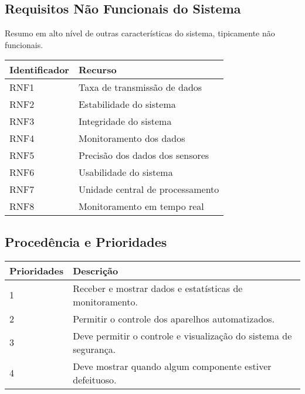 \subsection{Requisitos Não Funcionais do Sistema}

	Resumo em alto nível de outras características do sistema, tipicamente não funcionais.

\begin{tabular}{|l|l|}
\hline 
\textbf{Identificador} & \textbf{Recurso}\tabularnewline
\hline 
\hline 
RNF1 & Taxa de transmissão de dados\tabularnewline
\hline 
RNF2 & Estabilidade do sistema\tabularnewline
\hline 
RNF3 & Integridade do sistema\tabularnewline
\hline 
RNF4 & Monitoramento dos dados\tabularnewline
\hline 
RNF5 & Precisão dos dados dos sensores\tabularnewline
\hline 
RNF6 & Usabilidade do sistema\tabularnewline
\hline 
RNF7 & Unidade central de processamento\tabularnewline
\hline 
RNF8 & Monitoramento em tempo real\tabularnewline
\hline 
\end{tabular}

\subsection{Procedência e Prioridades}

\begin{tabular}{|l|l|}
\hline 
\textbf{Prioridades} & \textbf{Descrição}\tabularnewline
\hline 
\hline 
1 & Receber e mostrar dados e estatísticas de monitoramento. \tabularnewline
\hline 
2 & Permitir o controle dos aparelhos automatizados. \tabularnewline
\hline 
3 & Deve permitir o controle e visualização do sistema de segurança. \tabularnewline
\hline 
4 & Deve mostrar quando algum componente estiver defeituoso. \tabularnewline
\hline 
\end{tabular}

